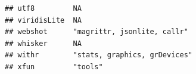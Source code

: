 \documentclass[]{article}
\begin{document}
\begin{verbatim}
## utf8         NA                                                                                                                                                                                                                                                                                                                                                                                                                                                                                    
## viridisLite  NA                                                                                                                                                                                                                                                                                                                                                                                                                                                                                    
## webshot      "magrittr, jsonlite, callr"                                                                                                                                                                                                                                                                                                                                                                                                                                                           
## whisker      NA                                                                                                                                                                                                                                                                                                                                                                                                                                                                                    
## withr        "stats, graphics, grDevices"                                                                                                                                                                                                                                                                                                                                                                                                                                                          
## xfun         "tools"                                                                                                                                                                                                                                                                                                                                                                                                                                                                               

\end{verbatim}
\end{document}
